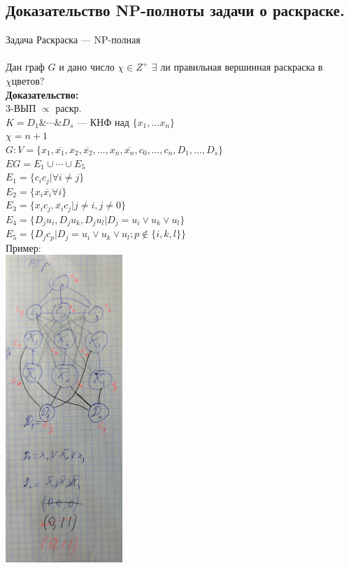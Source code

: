 \documentclass[12pt]{article}
\begin{document}
\subsection{Доказательство NP-полноты задачи о раскраске.}
	Задача Раскраска — NP-полная\\\\
	Дан граф $G$ и дано число $\chi \in Z^+$ $\exists$ ли правильная вершинная раскраска в $\chi цветов$?\\
	\textbf{Доказательство:}\\
		3-ВЫП $\propto$ раскр.\\
		$K = D_1 \& \dotsb \& D_s$ — КНФ над $\{x_1, \dotsc x_n\}$\\
		$\chi = n + 1$\\
		$G: V = \{x_1, \overline{x_1}, x_2, \overline{x_2}, \dotsc, x_n, \overline{x_n}, c_0, \dotsc, c_n, D_1, \dotsc, D_s\}$\\
		$EG = E_1 \cup \dotsb \cup E_5$\\
		$E_1 = \{c_ic_j | \forall i \neq j\}$\\
		$E_2 = \{x_i\overline{x_i} \forall i\}$\\
		$E_3 = \{x_ic_j, \overline{x_i}c_j | j \neq i, j \neq 0\}$\\
		$E_4 = \{D_ju_i, D_ju_k, D_ju_l | D_j = u_i \vee u_k \vee u_l\}$\\
		$E_5 = \{D_jc_p | D_j = u_i \vee u_k \vee u_l; p \notin \{i, k, l\}\}$\\
		Пример:\\
		\includegraphics[height=330pt]{64}\\
\end{document}

